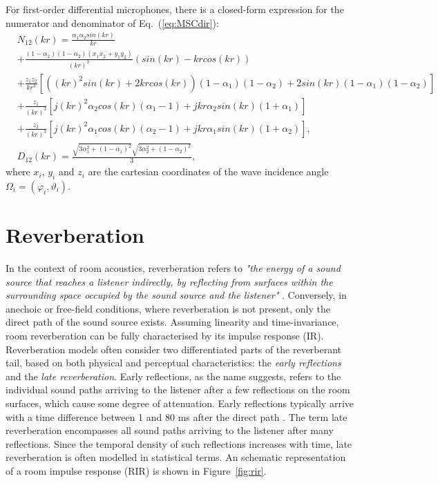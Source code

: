 \newpage
For first-order differential microphones, there is a closed-form expression for the numerator and denominator of Eq.~(\ref{eq:MSCdir}):
\begin{equation}
	\begin{aligned}
    &N_{12}(k r) =  \frac{\alpha_1 \alpha_2 sin(kr)}{kr} \\
    &+ \frac{(1-\alpha_2)(1-\alpha_2)(x_1x_2+y_1y_2)}{(kr)^3}(sin(kr)-kr cos(kr)) \\
    &+ \frac{z_1 z_2}{kr^3}[ ( (kr)^2 sin(kr) + 2kr cos(kr) )(1-\alpha_1)(1-\alpha_2) 
    + 2 sin(kr)(1-\alpha_1)(1-\alpha_2) ] \\
    &+ \frac{z_1}{(kr)^3}[ j(kr)^2 \alpha_2 cos(kr)(\alpha_1-1) + jkr \alpha_2 sin(kr)(1+\alpha_1) ] \\
    &+ \frac{z_2}{(kr)^3}[ j(kr)^2 \alpha_1 cos(kr)(\alpha_2-1) + jkr \alpha_1 sin(kr)(1+\alpha_2) ],\\
    &D_{12}(kr) =  \frac{\sqrt{3 \alpha_1^2+(1-\alpha_1)^2}\sqrt{3 \alpha_2^2+(1-\alpha_2)^2}}{3},
    \label{eq:closedform_msc}
    \end{aligned}
\end{equation}
where $x_i$, $y_i$ and $z_i$ are the cartesian coordinates of the wave incidence angle $\Omega_i = (\varphi_i, \vartheta_i)$.





\section{Reverberation}

In the context of room acoustics, reverberation refers to \textit{"the energy of a sound source that reaches a listener indirectly, by reflecting from surfaces within the surrounding space occupied by the sound source and the listener"} \cite{begault20003}. 
Conversely, in anechoic or free-field conditions, where reverberation is not present, only the direct path of the sound source exists.
Assuming linearity and time-invariance, room reverberation can be fully characterised by its impulse response (IR). \\

Reverberation models often consider two differentiated parts of the reverberant tail, based on both physical and perceptual characteristics: the \textit{early reflections} and the \textit{late reverberation}. 
Early reflections, as the name suggests, refers to the individual sound paths arriving to the listener after a few reflections on the room surfaces, which cause some degree of attenuation. Early reflections typically arrive with a time difference between 1 and 80 ms after the direct path \cite{begault20003}. 
The term late reverberation encompasses all sound paths arriving to the listener after many reflections. Since the temporal density of such reflections increases with time, late reverberation is often modelled in statistical terms.
An schematic representation of a room impulse response (RIR) is shown in Figure~\ref{fig:rir}.\\

